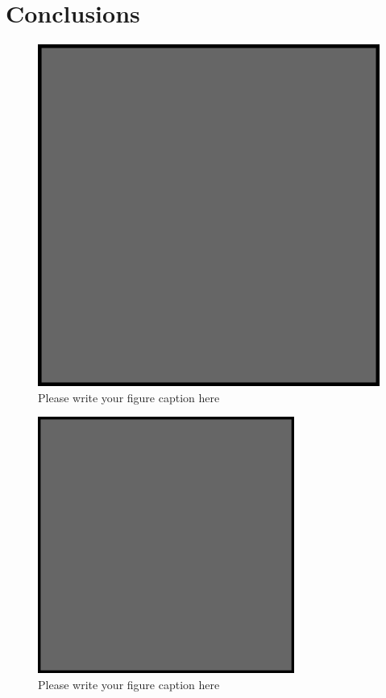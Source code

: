 \section{Conclusions} \label{conclusions}
\begin{figure}
  \includegraphics{example.eps}
\caption{Please write your figure caption here}
\label{fig:1}       %
\end{figure}
%
\begin{figure}
  \includegraphics[width=0.75\textwidth]{example.eps}
\caption{Please write your figure caption here}
\label{fig:2}       %
\end{figure}

